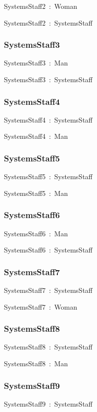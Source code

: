 \documentclass{article}
\begin{document}
SystemsStaff2~:~Woman

SystemsStaff2~:~SystemsStaff

\subsubsection*{SystemsStaff3}

SystemsStaff3~:~Man

SystemsStaff3~:~SystemsStaff

\subsubsection*{SystemsStaff4}

SystemsStaff4~:~SystemsStaff

SystemsStaff4~:~Man

\subsubsection*{SystemsStaff5}

SystemsStaff5~:~SystemsStaff

SystemsStaff5~:~Man

\subsubsection*{SystemsStaff6}

SystemsStaff6~:~Man

SystemsStaff6~:~SystemsStaff

\subsubsection*{SystemsStaff7}

SystemsStaff7~:~SystemsStaff

SystemsStaff7~:~Woman

\subsubsection*{SystemsStaff8}

SystemsStaff8~:~SystemsStaff

SystemsStaff8~:~Man

\subsubsection*{SystemsStaff9}

SystemsStaff9~:~SystemsStaff
\end{document}
